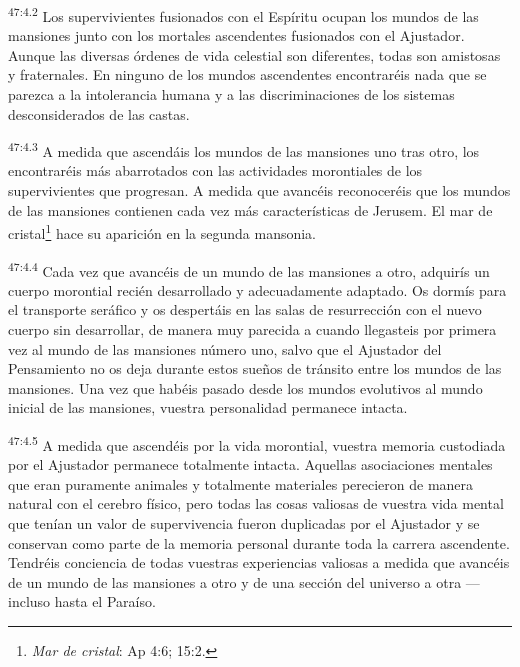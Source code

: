 \par
\textsuperscript{47:4.2} Los supervivientes fusionados con el Espíritu ocupan los mundos de las mansiones junto con los mortales ascendentes fusionados con el Ajustador. Aunque las diversas órdenes de vida celestial son diferentes, todas son amistosas y fraternales. En ninguno de los mundos ascendentes encontraréis nada que se parezca a la intolerancia humana y a las discriminaciones de los sistemas desconsiderados de las castas.

\par
\textsuperscript{47:4.3} A medida que ascendáis los mundos de las mansiones uno tras otro, los encontraréis más abarrotados con las actividades morontiales de los supervivientes que progresan. A medida que avancéis reconoceréis que los mundos de las mansiones contienen cada vez más características de Jerusem. El mar de cristal\footnote{\textit{Mar de cristal}: Ap 4:6; 15:2.} hace su aparición en la segunda mansonia.

\par
\textsuperscript{47:4.4} Cada vez que avancéis de un mundo de las mansiones a otro, adquirís un cuerpo morontial recién desarrollado y adecuadamente adaptado. Os dormís para el transporte seráfico y os despertáis en las salas de resurrección con el nuevo cuerpo sin desarrollar, de manera muy parecida a cuando llegasteis por primera vez al mundo de las mansiones número uno, salvo que el Ajustador del Pensamiento no os deja durante estos sueños de tránsito entre los mundos de las mansiones. Una vez que habéis pasado desde los mundos evolutivos al mundo inicial de las mansiones, vuestra personalidad permanece intacta.

\par
\textsuperscript{47:4.5} A medida que ascendéis por la vida morontial, vuestra memoria custodiada por el Ajustador permanece totalmente intacta. Aquellas asociaciones mentales que eran puramente animales y totalmente materiales perecieron de manera natural con el cerebro físico, pero todas las cosas valiosas de vuestra vida mental que tenían un valor de supervivencia fueron duplicadas por el Ajustador y se conservan como parte de la memoria personal durante toda la carrera ascendente. Tendréis conciencia de todas vuestras experiencias valiosas a medida que avancéis de un mundo de las mansiones a otro y de una sección del universo a otra ---incluso hasta el Paraíso.

